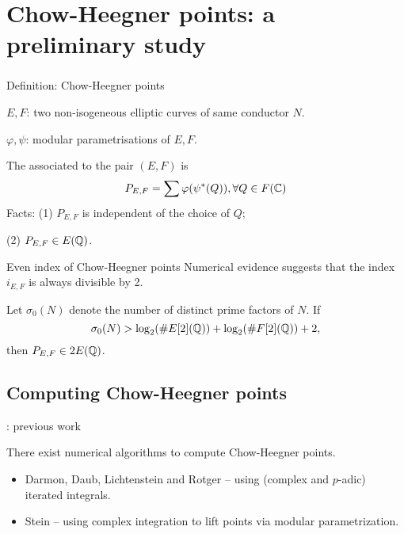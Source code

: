 \documentclass[handout]{beamer}
\begin{document}
\section{Chow-Heegner points: a preliminary study}


 \begin{frame}
 \frametitle{\insertsection}
 \tableofcontents[currentsection]
 \end{frame}

\begin{frame}[fragile]{Definition: Chow-Heegner points}
\begin{center}
\end{center}
$E,F$: two non-isogeneous elliptic curves of  same conductor $N$. 

$\varphi, \psi$: modular parametrisations of $E,F$. 

The  associated to the pair $(E,F)$ is 
\[
	P_{E,F} = \sum \varphi(\psi^{*}(Q)), \forall Q \in F(\mathbb{C}) 
\]
Facts: (1) $P_{E,F}$ is independent of the choice of $Q$;  

\qquad \quad (2) $P_{E,F} \in E(\mathbb{Q})$. 

\end{frame}


\begin{frame}{Even index of Chow-Heegner points}
Numerical evidence suggests that the index $i_{E,F}$ is always divisible by 2. 
\begin{theorem}[C.]
Let $\sigma_0(N)$ denote the number of distinct prime factors of $N$. If 
\[
	\sigma_0(N) > \log_2(\# E[2](\mathbb{Q})) + \log_2(\# F[2](\mathbb{Q})) + 2,
\]
then $P_{E,F} \in 2E(\mathbb{Q})$. 
\end{theorem}
\end{frame}

\subsection{Computing Chow-Heegner points}

\begin{frame}{\insertsubsection : previous work}

There exist numerical algorithms to compute Chow-Heegner points.  

\medskip 

\begin{itemize}
\item Darmon, Daub, Lichtenstein and Rotger -- using (complex and $p$-adic) iterated integrals. 
\item Stein  -- using complex integration to lift points via modular parametrization. 
\end{itemize}



\end{frame}
\end{document}

